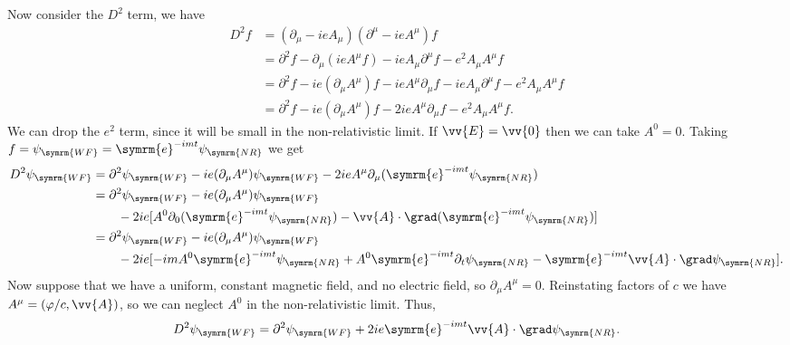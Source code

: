\documentclass[fleqn]{NotesClass}
\newcommand{\e}{\symrm{e}}
\newcommand{\covariantDerivative}{D}
\newcommand{\dalembertian}{\partial^2}
\begin{document}
    Now consider the \(\covariantDerivative^2\) term, we have
    \begin{align}
        \covariantDerivative^2 f &= (\partial_\mu - ieA_\mu)(\partial^\mu - ieA^\mu) f\\
        &= \dalembertian f - \partial_\mu (ieA^\mu f) - ieA_\mu \partial^\mu f - e^2 A_\mu A^\mu f\\
        &= \dalembertian f - ie (\partial_\mu A^\mu) f - ie A^\mu \partial_\mu f - ieA_\mu \partial^\mu f - e^2 A_\mu A^\mu f\\
        &= \dalembertian f - ie(\partial_\mu A^\mu)f - 2ieA^\mu \partial_\mu f - e^2 A_\mu A^\mu f.
    \end{align}
    We can drop the \(e^2\) term, since it will be small in the non-relativistic limit.
    If \(\vv{E} = \vv{0}\) then we can take \(A^0 = 0\).
    Taking \(f = \psi_{\symrm{WF}} = \e^{-imt}\psi_{\symrm{NR}}\) we get
    \begin{align}
        \covariantDerivative^2\psi_{\symrm{WF}} &= \dalembertian \psi_{\symrm{WF}} - ie(\partial_\mu A^\mu)\psi_{\symrm{WF}} - 2ieA^\mu \partial_\mu(\e^{-imt}\psi_{\symrm{NR}})\\
        &= \dalembertian \psi_{\symrm{WF}} - ie(\partial_\mu A^\mu)\psi_{\symrm{WF}} \notag\\
        &\qquad - 2ie[A^0 \partial_0 (\e^{-imt} \psi_{\symrm{NR}}) - \vv{A} \cdot \grad (\e^{-imt} \psi_{\symrm{NR}})]\\
        &=  \dalembertian \psi_{\symrm{WF}} - ie(\partial_\mu A^\mu)\psi_{\symrm{WF}}\\
        &\qquad - 2ie[-im A^0\e^{-imt} \psi_{\symrm{NR}} + A^0\e^{-imt} \partial_t \psi_{\symrm{NR}} - \e^{-imt}\vv{A} \cdot \grad\psi_{\symrm{NR}}].\notag
    \end{align}
    Now suppose that we have a uniform, constant magnetic field, and no electric field, so \(\partial_\mu A^\mu = 0\).
    Reinstating factors of \(c\) we have \(A^\mu = (\varphi/c, \vv{A})\), so we can neglect \(A^0\) in the non-relativistic limit.
    Thus,
    \begin{equation}
        \covariantDerivative^2 \psi_{\symrm{WF}} = \dalembertian \psi_{\symrm{WF}} + 2ie\e^{-imt} \vv{A} \cdot \grad \psi_{\symrm{NR}}.
    \end{equation}
    
\end{document}
